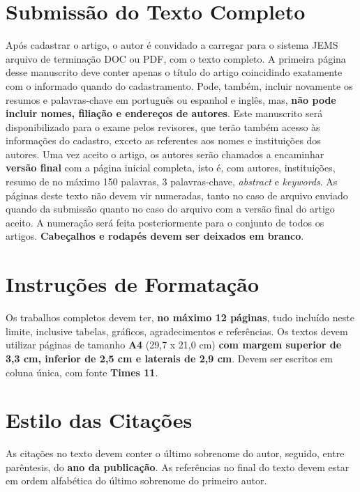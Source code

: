 \documentclass[11pt]{article}
\begin{document}
\section{Submissão do Texto Completo}

Após cadastrar o artigo, o autor é convidado a carregar para o sistema JEMS arquivo de terminação DOC ou PDF, com o texto completo. A primeira página desse manuscrito deve conter apenas o título do artigo coincidindo exatamente com o informado quando do cadastramento. Pode, também, incluir novamente os resumos e palavras-chave em português ou espanhol e inglês, mas, \textbf{não pode incluir nomes, filiação e endereços de autores}.
Este manuscrito será disponibilizado para o exame pelos revisores, que terão também acesso às informações do cadastro, exceto as referentes aos nomes e instituições dos autores. Uma vez aceito o artigo, os autores serão chamados a encaminhar \textbf{versão final} com a página inicial completa, isto é, com autores, instituições, resumo de no máximo 150 palavras, 3 palavras-chave, \textit{abstract} e \textit{keywords}.
As páginas deste texto não devem vir numeradas, tanto no caso de arquivo enviado quando da submissão quanto no caso do arquivo com a versão final do artigo aceito. A numeração será feita posteriormente para o conjunto de todos os artigos. \textbf{Cabeçalhos e rodapés devem ser deixados em branco}.


\section{Instruções de Formatação}

Os trabalhos completos devem ter, \textbf{no máximo 12 páginas}, tudo incluído neste limite, inclusive tabelas, gráficos, agradecimentos e referências.
Os textos devem utilizar páginas de tamanho \textbf{A4} (29,7 x 21,0 cm) \textbf{com margem superior de 3,3 cm, inferior de 2,5 cm e laterais de 2,9 cm}. Devem ser escritos em coluna única, com fonte \textbf{Times 11}.

\section{Estilo das Citações}

As citações no texto devem conter o último sobrenome do autor, seguido, entre parêntesis, do \textbf{ano da publicação}. As referências no final do texto devem estar em ordem alfabética do último sobrenome do primeiro autor.
\end{document}
